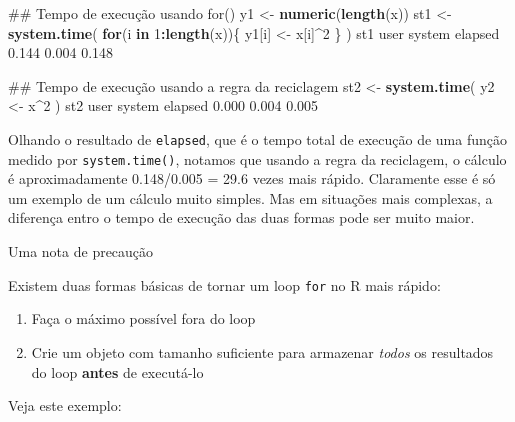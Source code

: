 \documentclass[10pt,a4paper]{book}
\newenvironment{Shaded}{\begin{snugshade}}{\end{snugshade}}
\newcommand{\KeywordTok}[1]{\textcolor[rgb]{0.13,0.29,0.53}{\textbf{#1}}}
\newcommand{\DecValTok}[1]{\textcolor[rgb]{0.00,0.00,0.81}{#1}}
\newcommand{\FloatTok}[1]{\textcolor[rgb]{0.00,0.00,0.81}{#1}}
\newcommand{\StringTok}[1]{\textcolor[rgb]{0.31,0.60,0.02}{#1}}
\newcommand{\ControlFlowTok}[1]{\textcolor[rgb]{0.13,0.29,0.53}{\textbf{#1}}}
\newcommand{\OperatorTok}[1]{\textcolor[rgb]{0.81,0.36,0.00}{\textbf{#1}}}
\newcommand{\NormalTok}[1]{#1}
\providecommand{\tightlist}{%
  \setlength{\itemsep}{0pt}\setlength{\parskip}{0pt}}
\begin{document}
\begin{Shaded}
\begin{Highlighting}[]
\NormalTok{## Tempo de execução usando for()}
\NormalTok{y1 <-}\StringTok{ }\KeywordTok{numeric}\NormalTok{(}\KeywordTok{length}\NormalTok{(x))}
\NormalTok{st1 <-}\StringTok{ }\KeywordTok{system.time}\NormalTok{(}
    \ControlFlowTok{for}\NormalTok{(i }\ControlFlowTok{in} \DecValTok{1}\OperatorTok{:}\KeywordTok{length}\NormalTok{(x))\{}
\NormalTok{        y1[i] <-}\StringTok{ }\NormalTok{x[i]}\OperatorTok{^}\DecValTok{2}
\NormalTok{    \}}
\NormalTok{)}
\NormalTok{st1}
\NormalTok{   user  system elapsed }
  \FloatTok{0.144}   \FloatTok{0.004}   \FloatTok{0.148} 

\NormalTok{## Tempo de execução usando a regra da reciclagem}
\NormalTok{st2 <-}\StringTok{ }\KeywordTok{system.time}\NormalTok{(}
\NormalTok{    y2 <-}\StringTok{ }\NormalTok{x}\OperatorTok{^}\DecValTok{2}
\NormalTok{)}
\NormalTok{st2}
\NormalTok{   user  system elapsed }
  \FloatTok{0.000}   \FloatTok{0.004}   \FloatTok{0.005} 
\end{Highlighting}
\end{Shaded}

Olhando o resultado de \texttt{elapsed}, que é o tempo total de execução
de uma função medido por \texttt{system.time()}, notamos que usando a
regra da reciclagem, o cálculo é aproximadamente 0.148/0.005 = 29.6
vezes mais rápido. Claramente esse é só um exemplo de um cálculo muito
simples. Mas em situações mais complexas, a diferença entro o tempo de
execução das duas formas pode ser muito maior.

Uma nota de precaução

Existem duas formas básicas de tornar um loop \texttt{for} no R mais
rápido:

\begin{enumerate}
\def\labelenumi{\arabic{enumi}.}
\tightlist
\item
  Faça o máximo possível fora do loop
\item
  Crie um objeto com tamanho suficiente para armazenar \emph{todos} os
  resultados do loop \textbf{antes} de executá-lo
\end{enumerate}

Veja este exemplo:
\end{document}
